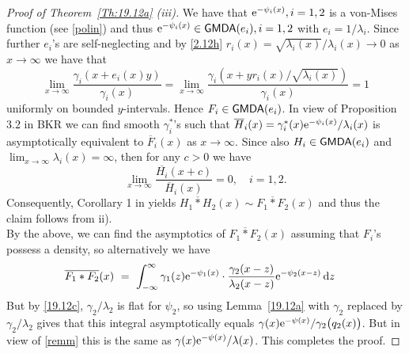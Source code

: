 \begin{subappendices}
\begin{proof}[Proof of Theorem~{\ref{Th:19.12a}} {\rm (iii)}]
We have that $\mathrm{e}^{- \psi_i(x)},i=1,2$ is a von-Mises function (see \eqref{polin}) and thus  $\mathrm{e}^{- \psi_i(x)} \in \mathsf{GMDA}(e_i),i=1,2$ with $e_i=1/\lambda_i$. Since further $e_i$'s are self-neglecting and by \eqref{2.12h} $r_i(x)= \sqrt{\lambda_i(x)}/\lambda_i(x) \to 0$
as $x\to \infty$ we have that %
$$ \lim_{x\to \infty}\frac{\gamma_i(x+ e_i(x)y )}{\gamma_i(x)}=
\lim_{x\to \infty}\frac{\gamma_i(x+ yr_i(x)/ \sqrt{\lambda_i(x)} )}{\gamma_i(x)} =1$$
uniformly on bounded $y$-intervals. Hence  $F_i \in \mathsf{GMDA}(e_i)$. In view of Proposition 3.2 in BKR we can find smooth $\gamma_i^*$'s such that $\overline{H}_i(x)= \gamma_i^*(x)\mathrm{e}^{- \psi_i(x)}/\lambda_i(x)$ is asymptotically equivalent to $\overline{F}_i(x)$ as $x\to \infty$. Since also $H_i\in \mathsf{GMDA}(e_i)$ and $\lim_{x\to \infty} \lambda_i(x)= \infty$, then for any $c>0$ we have
$$ \lim_{x\to \infty} \frac{\overline{H_i}(x+ c)}{\overline H_i(x)}=
0, \quad i=1,2.$$
Consequently, Corollary 1 in \cite{EHM} yields $\overline{H_1*H_2}(x) \sim
\overline{F_1*F_2}(x)$ and thus the claim follows from ii).\\ 	
By the above, we can find the asymptotics of $\overline{F_1*F_2}(x)$ assuming that $F_i$'s possess a density, so alternatively we have
\begin{align}\overline{F_1*F_2}(x)\ &=\ \int_{-\infty}^\infty \gamma_1(z)\mathrm{e}^{-\psi_1(x)}\cdot\frac{\gamma_2(x-z)}
{\lambda_2(x-z)} \mathrm{e}^{-\psi_2(x-z)}\,\mathrm{d} z
\end{align}
But by \eqref{19.12c}, $\gamma_2/\lambda_2$ is flat for $\psi_2$, so using Lemma~\ref{19.12a}
with $\gamma_2$ replaced by $\gamma_2/\lambda_2$ gives that
this integral asymptotically equals $\gamma(x)\mathrm{e}^{-\psi(x)}/\gamma_2\bigl(q_2(x)\bigr)$.
But in view of \eqref{remm} this is the same as $\gamma(x)\mathrm{e}^{-\psi(x)}/\lambda(x)$. 
This completes the proof.
\end{proof}

\end{subappendices}
